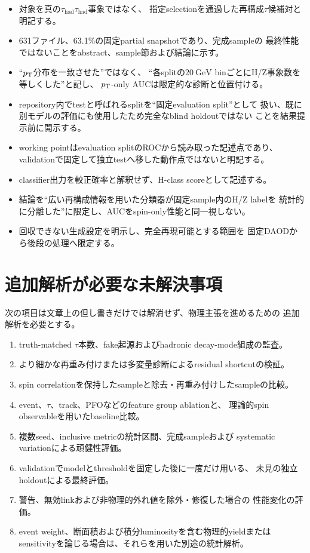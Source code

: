 \documentclass[xelatex,ja=standard,a4paper,10pt]{bxjsarticle}
\begin{document}
\begin{itemize}
  \item 対象を真の\(\tau_{\mathrm{had}}\tau_{\mathrm{had}}\)事象ではなく、
    指定selectionを通過した再構成\(\tau\)候補対と明記する。
  \item 631ファイル、63.1\%の固定partial snapshotであり、完成sampleの
    最終性能ではないことをabstract、sample節および結論に示す。
  \item ``\(p_{\mathrm{T}}\)分布を一致させた''ではなく、
    ``各splitの\(\SI{20}{\GeV}\) binごとにH/Z事象数を等しくした''と記し、
    \(p_{\mathrm{T}}\)-only AUCは限定的な診断と位置付ける。
  \item repository内でtestと呼ばれるsplitを``固定evaluation split''として
    扱い、既に別モデルの評価にも使用したため完全なblind holdoutではない
    ことを結果提示前に開示する。
  \item working pointはevaluation splitのROCから読み取った記述点であり、
    validationで固定して独立testへ移した動作点ではないと明記する。
  \item classifier出力を較正確率と解釈せず、H-class scoreとして記述する。
  \item 結論を``広い再構成情報を用いた分類器が固定sample内のH/Z labelを
    統計的に分離した''に限定し、AUCをspin-only性能と同一視しない。
  \item 回収できない生成設定を明示し、完全再現可能とする範囲を
    固定DAODから後段の処理へ限定する。
\end{itemize}

\section{追加解析が必要な未解決事項}

次の項目は文章上の但し書きだけでは解消せず、物理主張を進めるための
追加解析を必要とする。

\begin{enumerate}
  \item truth-matched \(\tau\)本数、fake起源およびhadronic decay-mode組成の監査。
  \item より細かな再重み付けまたは多変量診断によるresidual shortcutの検証。
  \item spin correlationを保持したsampleと除去・再重み付けしたsampleの比較。
  \item event、\(\tau\)、track、PFOなどのfeature group ablationと、
    理論的spin observableを用いたbaseline比較。
  \item 複数seed、inclusive metricの統計区間、完成sampleおよび
    systematic variationによる頑健性評価。
  \item validationでmodelとthresholdを固定した後に一度だけ用いる、
    未見の独立holdoutによる最終評価。
  \item 警告、無効linkおよび非物理的外れ値を除外・修復した場合の
    性能変化の評価。
  \item event weight、断面積および積分luminosityを含む物理的yieldまたは
    sensitivityを論じる場合は、それらを用いた別途の統計解析。
\end{enumerate}
\end{document}
